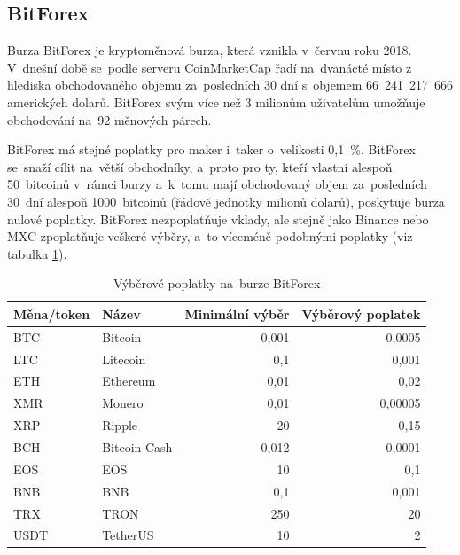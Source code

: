 \documentclass[thesis=B,czech]{FITthesis}[2019/03/21]
\begin{document}
\subsection{BitForex}
Burza BitForex je kryptoměnová burza, která vznikla v~červnu roku 2018. V~dnešní době se~podle serveru CoinMarketCap řadí na~dvanácté místo z hlediska obchodovaného objemu za~posledních 30 dní s~objemem 66~241~217~666 amerických dolarů. \cite{coinmarketcap} BitForex svým více než 3 milionům uživatelům \linebreak umožňuje obchodování na~92 měnových párech.  \cite{cryptowisser_bitforex}

BitForex má stejné poplatky pro maker i~taker o~velikosti 0,1~\%. BitForex se~snaží cílit na~větší obchodníky, a~proto pro ty, kteří vlastní alespoň 50~bitcoinů v~rámci burzy a~k~tomu mají obchodovaný objem za~posledních 30~dní alespoň 1000~bitcoinů (řádově jednotky milionů dolarů), poskytuje burza nulové poplatky. BitForex nezpoplatňuje vklady, ale stejně jako Binance nebo MXC zpoplatňuje veškeré výběry, a~to víceméně podobnými poplatky (viz tabulka \ref{bitforex_fees}). \cite{cryptowisser_bitforex}

\begin{table}\centering
    \caption{Výběrové poplatky na~burze BitForex \cite{bitforex_fees}}
    \label{bitforex_fees}
    \begin{tabular}{||l | l | r | r||} 
     \hline
     Měna/token & Název & Minimální výběr & Výběrový poplatek \\ [0.5ex] 
     \hline\hline
     BTC & Bitcoin & 0,001 & 0,0005 \\ 
     \hline
     LTC & Litecoin & 0,1 & 0,001 \\
     \hline
     ETH & Ethereum & 0,01 & 0,02 \\
     \hline
     XMR & Monero & 0,01 & 0,00005 \\
     \hline
     XRP & Ripple & 20 & 0,15 \\
     \hline
     BCH & Bitcoin Cash & 0,012 & 0,0001 \\
     \hline
     EOS & EOS & 10 & 0,1 \\
     \hline
     BNB & BNB & 0,1 & 0,001 \\
     \hline
     TRX & TRON & 250 & 20 \\
     \hline
     USDT & TetherUS & 10 & 2 \\
     \hline
    \end{tabular}
\end{table}
\end{document}
